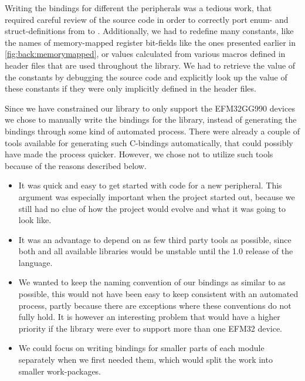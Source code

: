 
Writing the bindings for different the peripherals was a tedious work, that required careful review of the \emlib source code in order to correctly port enum- and struct-definitions from {\C} to {\rust}.
Additionally, we had to redefine many constants, like the names of memory-mapped register bit-fields like the ones presented earlier in \autoref{fig:back:memorymapped}, or values calculated from various {\C} macros defined in header files that are used throughout the library.
We had to retrieve the value of the constants by debugging the source code and explicitly look up the value of these constants if they were only implicitly defined in the header files.

Since we have constrained our library to only support the EFM32GG990 devices we chose to manually write the bindings for the library, instead of generating the bindings through some kind of automated process.
There were already a couple of tools available for generating such C-bindings automatically, that could possibly have made the process quicker.
However, we chose not to utilize such tools because of the reasons described below.

\begin{itemize}
    \item It was quick and easy to get started with code for a new peripheral.
    This argument was especially important when the project started out, because we still had no clue of how the project would evolve and what it was going to look like.

    \item It was an advantage to depend on as few third party tools as possible, since both {\rust} and all available libraries would be unstable until the 1.0 release of the language.

    \item We wanted to keep the naming convention of our bindings as similar to {\emlib} as possible, this would not have been easy to keep consistent with an automated process, partly because there are exceptions where these conventions do not fully hold.
    It is however an interesting problem that would have a higher priority if the library were ever to support more than one EFM32 device.

    \item We could focus on writing bindings for smaller parts of each module separately when we first needed them, which would split the work into smaller work-packages.
\end{itemize}
